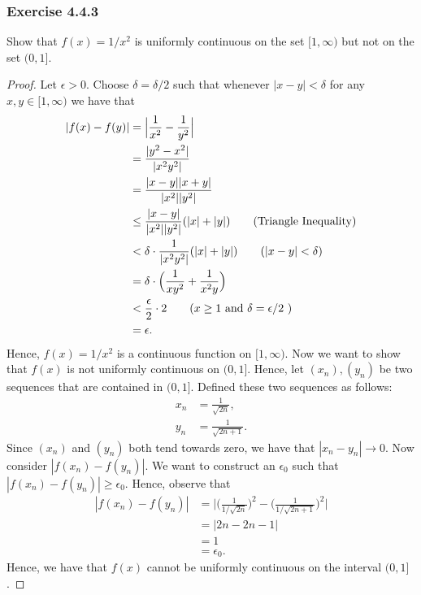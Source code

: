 \subsubsection{Exercise 4.4.3} Show that \( f(x) = 1 / x^2  \) is uniformly continuous on the set \( [1, \infty  ) \) but not on the set \( (0,1] \).
\begin{proof}
    Let \( \epsilon > 0  \). Choose \( \delta = \delta / 2  \) such that whenever \( | x - y  | < \delta  \) for any \( x,y \in [1,\infty ) \) we have that 
    \begin{align*}
        | f(x) - f(y) | &= \Big| \frac{ 1 }{ x^2  } - \frac{ 1 }{ y^2  }  \Big|   \\
                        &= \frac{ | y^2 - x^2  |  }{  | x^2 y^2  |  } \\
                        &= \frac{ | x - y  | | x + y  |  }{ | x^2  | | y^2  |  }   \\
                        &\leq \frac{ | x - y  |  }{ | x^2  | | y^2  |  } (| x | + | y | ) \tag{Triangle Inequality}\\
                        &< \delta \cdot \frac{ 1 }{ | x^2 y^2  |  } (| x  | + | y | ) \tag{\( | x - y  | < \delta  \)}\\ 
                        &= \delta \cdot \Big( \frac{ 1 }{ x y^2  } + \frac{ 1 }{ x^2 y  }  \Big) \\
                        &< \frac{ \epsilon  }{ 2 }  \cdot 2 \tag{\( x \geq  1  \) \text{and} \( \delta = \epsilon / 2  \) } \\  
                        &= \epsilon.
    \end{align*}
    Hence, \( f(x) = 1 / x^2  \) is a continuous function on \( [1, \infty) \).
    Now we want to show that \( f(x) \) is not uniformly continuous on \( (0,1] \). Hence, let \( (x_n), (y_n) \) be two sequences that are contained in \( (0,1] \). Defined these two sequences as follows: 
    \begin{align*}
        x_n &= \frac{ 1 }{ \sqrt{ 2n }  },  \\
        y_n &= \frac{ 1 }{ \sqrt{ 2n + 1  }  }.
    \end{align*}
    Since \( (x_n) \) and \( (y_n) \) both tend towards zero, we have that \( | x_n - y_n  | \to 0  \). Now consider \( | f(x_n) - f(y_n) |  \). We want to construct an \( \epsilon_0  \) such that \( | f(x_n) - f(y_n) | \geq \epsilon_0  \). Hence, observe that 
    \begin{align*}
        | f(x_n) - f(y_n)  | &= \Big| \Big( \frac{ 1 }{ 1 / \sqrt{ 2n }  } \Big)^2  - \Big( \frac{ 1  }{ 1 / \sqrt{ 2n + 1  }  } \Big)^2   \Big|   \\
                             &= |  2n - 2n - 1  | \\
                             &= 1 \\
                             &= \epsilon_0.
    \end{align*}
    Hence, we have that \( f(x) \) cannot be uniformly continuous on the interval \( (0, 1] \).
\end{proof}



